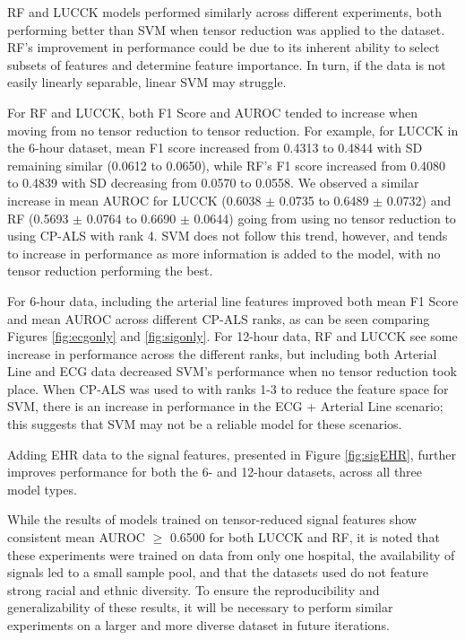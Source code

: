 
RF and LUCCK models performed similarly across different experiments, both performing better than SVM when tensor reduction was applied to the dataset. RF's improvement in performance could be due to its inherent ability to select subsets of features and determine feature importance. In turn, if the data is not easily linearly separable, linear SVM may struggle.

For RF and LUCCK, both F1 Score and AUROC tended to increase when moving from no tensor reduction to tensor reduction. For example, for LUCCK in the 6-hour dataset, mean F1 score increased from 0.4313 to 0.4844 with SD remaining similar (0.0612 to 0.0650), while RF's F1 score increased from 0.4080 to 0.4839 with SD decreasing from 0.0570 to 0.0558. We observed a similar increase in mean AUROC for LUCCK (0.6038 $\pm$ 0.0735 to 0.6489 $\pm$ 0.0732) and RF (0.5693 $\pm$ 0.0764 to 0.6690 $\pm$ 0.0644) going from using no tensor reduction to using CP-ALS with rank 4. SVM does not follow this trend, however, and tends to increase in performance as more information is added to the model, with no tensor reduction performing the best.

For 6-hour data, including the arterial line features improved both mean F1 Score and mean AUROC across different CP-ALS ranks, as can be seen comparing Figures \ref{fig:ecgonly} and \ref{fig:sigonly}. For 12-hour data, RF and LUCCK see some increase in performance across the different ranks, but including both Arterial Line and ECG data decreased SVM's performance when no tensor reduction took place. When CP-ALS was used to with ranks 1-3 to reduce the feature space for SVM, there is an increase in performance in the ECG + Arterial Line scenario; this suggests that SVM may not be a reliable model for these scenarios.

Adding EHR data to the signal features, presented in Figure \ref{fig:sigEHR}, further improves performance for both the 6- and 12-hour datasets, across all three model types.

While the results of models trained on tensor-reduced signal features show consistent mean AUROC $\geq$ 0.6500 for both LUCCK and RF, it is noted that these experiments were trained on data from only one hospital, the availability of signals led to a small sample pool, and that the datasets used do not feature strong racial and ethnic diversity. To ensure the reproducibility and generalizability of these results, it will be necessary to perform similar experiments on a larger and more diverse dataset in future iterations.

